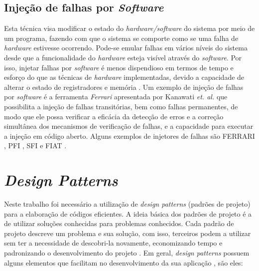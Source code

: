 \subsection{Injeção de falhas por \textit{Software}}

Esta técnica visa modificar o estado do \textit{hardware/software} do sistema por meio de um programa, fazendo com que o sistema se comporte como se uma falha de \textit{hardware} estivesse ocorrendo. Pode-se emular falhas em vários níveis do sistema desde que a funcionalidade do \textit{hardware} esteja visível através do \textit{software}. Por isso, injetar falhas por \textit{software} é menos dispendioso em termos de tempo e esforço do que as técnicas de \textit{hardware} implementadas, devido a capacidade de alterar o estado de registradores e memória \cite{Kanawati:1995}. Um exemplo de injeção de falhas por \textit{software} é a ferramenta \textit{Ferrari} apresentada por Kanawati \textit{et. al.} \cite{Kanawati:1995} que possibilita a injeção de falhas transitórias, bem como falhas permanentes, de modo que ele possa verificar a eficácia da detecção de erros e a correção simultânea dos mecanismos de verificação de falhas, e a capacidade para executar a injeção em código aberto. Alguns exemplos de injetores de falhas são FERRARI \cite{Kanawati:1995}, PFI \cite{Dawson:1995}, SFI \cite{Rosenberg:1993} e FIAT \cite{Segall:1988}. 


\section{\textit{Design Patterns}} \label{sec:designPattern}
				
Neste trabalho foi necessário a utilização de \textit{design patterns} (padrões de projeto) para a elaboração de códigos eficientes. A ideia básica dos padrões de projeto é a de utilizar soluções conhecidas para problemas conhecidos. Cada padrão de projeto descreve um problema e sua solução, com isso, terceiros podem a utilizar sem ter a necessidade de descobri-la novamente, economizando tempo e padronizando o desenvolvimento do projeto \cite{Vinicius:2009}. Em geral, \textit{design patterns} possuem alguns elementos que facilitam no desenvolvimento da sua aplicação \cite{Engholm:2010}, são eles:

